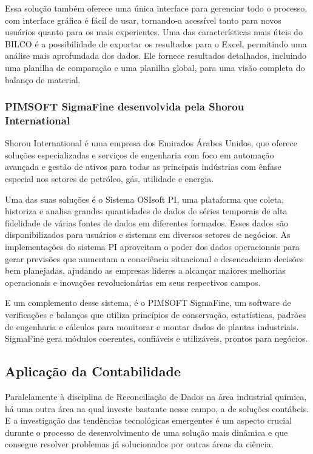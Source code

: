 Essa solução também oferece uma única interface para gerenciar todo o processo, com interface gráfica é fácil de usar, tornando-a acessível tanto para novos usuários quanto para os mais experientes. Uma das características mais úteis do BILCO é a possibilidade de exportar os resultados para o Excel, permitindo uma análise mais aprofundada dos dados. Ele fornece resultados detalhados, incluindo uma planilha de comparação e uma planilha global, para uma visão completa do balanço de material.

\subsubsection{PIMSOFT SigmaFine desenvolvida pela Shorou International}

Shorou International é uma empresa dos Emirados Árabes Unidos, que oferece soluções especializadas e serviços de engenharia com foco em automação avançada e gestão de ativos para todas as principais indústrias com ênfase especial nos setores de petróleo, gás, utilidade e energia.

Uma das suas soluções é o Sistema OSIsoft PI, uma plataforma que coleta, historiza e analisa grandes quantidades de dados de séries temporais de alta fidelidade de várias fontes de dados em diferentes formados. Esses dados são disponibilizados para usuários e sistemas em diversos setores de negócios. As implementações do sistema PI aproveitam o poder dos dados operacionais para gerar previsões que aumentam a consciência situacional e desencadeiam decisões bem planejadas, ajudando as empresas líderes a alcançar maiores melhorias operacionais e inovações revolucionárias em seus respectivos campos. 

E um complemento desse sistema, é o PIMSOFT SigmaFine, um software de verificações e balanços que utiliza princípios de conservação, estatísticas, padrões de engenharia e cálculos para monitorar e montar dados de plantas industriais. SigmaFine gera módulos coerentes, confiáveis e utilizáveis, prontos para negócios.

\subsection{Aplicação da Contabilidade}

Paralelamente à disciplina de Reconciliação de Dados na área industrial química, há uma outra área na qual investe bastante nesse campo, a de soluções contábeis. E a investigação das tendências tecnológicas emergentes é um aspecto crucial durante o processo de desenvolvimento de uma solução mais dinâmica e que consegue resolver problemas já solucionados por outras áreas da ciência.

